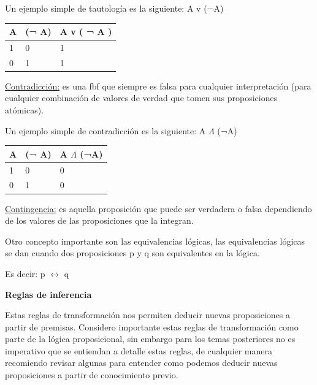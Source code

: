 \documentclass[11pt,fleqn]{book} %
\begin{document}
Un ejemplo simple de tautología es la siguiente: A v (¬A)

\begin{tabular}{|l|l|l|}
\hline
	A & (¬ A)	& A v ( ¬ A )\\
\hline
	1 & 0 & 1\\
\hline
	0 & 1 & 1\\
\hline
\end{tabular}

\underline{Contradicción:} es una fbf que siempre es falsa para cualquier interpretación (para cualquier combinación de valores de verdad que tomen sus proposiciones atómicas).

Un ejemplo simple de contradicción es la siguiente: A $\Lambda$ (¬A)

\begin{tabular}{|l|l|l|}
\hline
	A & (¬ A)	& A $\Lambda$ (¬A)\\
\hline
	1 & 0 & 0\\
\hline
	0 & 1 & 0\\
\hline
\end{tabular}

\underline{Contingencia:} es aquella proposición que puede ser verdadera o falsa dependiendo de los valores de las proposiciones que la integran.

Otro concepto importante son las equivalencias lógicas, las equivalencias lógicas se dan cuando dos proposiciones p y q son equivalentes en la lógica.

Es decir: p $\leftrightarrow$ q

\textbf{Reglas de inferencia} 

Estas reglas de transformación nos permiten deducir nuevas proposiciones a partir de premisas. Considero importante estas reglas de transformación como parte de la lógica proposicional, sin embargo para los temas posteriores no es imperativo que se entiendan a detalle estas reglas, de cualquier manera recomiendo revisar algunas para entender como podemos deducir nuevas proposiciones a partir de conocimiento previo.
\end{document}
